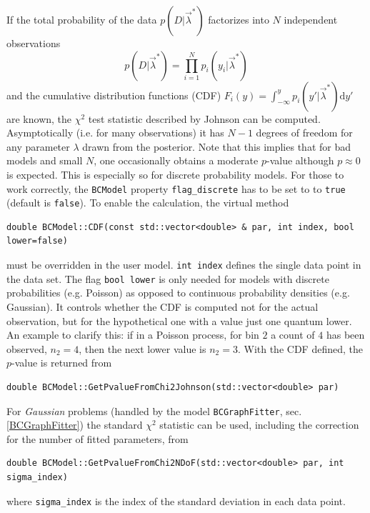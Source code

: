 \documentclass[11pt, a4paper]{article}
\begin{document}
If the total probability of the data $p\left(D|\vec{\lambda}^{*}\right)$
 factorizes into $N$ independent observations
$$p\left(D|\vec{\lambda}^{*}\right) = \prod_{i=1}^N
p_i\left(y_i|\vec{\lambda}^{*}\right)$$ and the cumulative
distribution functions (CDF) $F_i(y)= \int_{-\infty}^{y}
p_i(y'|\vec{\lambda}^{*}) \mathrm{d }y'$ are known, the $\chi^2$ test
statistic described by Johnson \cite{Johnson_pValue} can be computed.
Asymptotically (i.e. for many observations) it has $N-1$ degrees of
freedom for any parameter $\lambda$ drawn from the posterior. Note
that this implies that for bad models and small $N$, one occasionally
obtains a moderate $p$-value although $p\approx 0 $ is expected. This
is especially so for discrete probability models. For those to work
correctly, the \texttt{BCModel} property \verb|flag_discrete| has to
be set to to \texttt{true} (default is \texttt{false}).  To enable the
calculation, the virtual method
%
\begin{verbatim}
double BCModel::CDF(const std::vector<double> & par, int index, bool lower=false)
\end{verbatim}
%
must be overridden in the user model.  \verb|int index| defines the
single data point in the data set. The flag \verb|bool lower| is only
needed for models with discrete probabilities (e.g. Poisson) as
opposed to continuous probability densities (e.g. Gaussian). It
controls whether the CDF is computed not for the actual observation,
but for the hypothetical one with a value just one quantum lower. An
example to clarify this: if in a Poisson process, for bin $2$ a count
of $4$ has been observed, $n_2=4$, then the next lower value is
$n_2=3$.  With the CDF defined, the $p$-value is returned from
%
\begin{verbatim}
double BCModel::GetPvalueFromChi2Johnson(std::vector<double> par)
\end{verbatim}

For \textit{Gaussian} problems (handled by the model
\verb|BCGraphFitter|, sec. \ref{BCGraphFitter}) the standard $\chi^2$
statistic can be used, including the correction for the number of
fitted parameters, from
%
\begin{verbatim}
double BCModel::GetPvalueFromChi2NDoF(std::vector<double> par, int sigma_index)
\end{verbatim}
%
where \verb|sigma_index| is the index of the standard deviation in
each data point.
\end{document}
